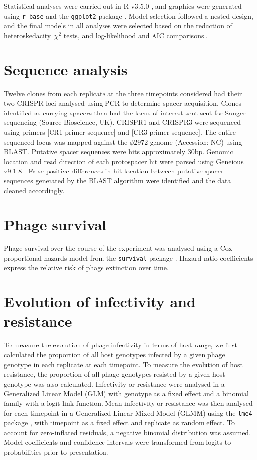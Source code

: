 \documentclass [12pt, a4paper, twoside]  {article}
\begin{document}
Statistical analyses were carried out in R v3.5.0 \citep{R}, and graphics were generated using \texttt{r-base} and the \texttt{ggplot2} package \citep{ggplot2}. Model selection followed a nested design, and the final models in all analyses were selected based on the reduction of heteroskedacity, $\chi ^2$ tests, and log-likelihood and AIC comparisons \citep{akaike1973,burnham2003model,burnham2004aic}.

\section*{Sequence analysis}
Twelve clones from each replicate at the three timepoints considered had their two CRISPR loci analysed using PCR to determine spacer acquisition. Clones identified as carrying spacers then had the locus of interest sent sent for Sanger sequencing (Source Bioscience, UK). CRISPR1 and CRISPR3 were sequenced using primers [CR1 primer sequence] and [CR3 primer sequence]. The entire sequenced locus was mapped against the $\phi 2972$ genome (Accession: NC) using BLAST. Putative spacer sequences were hits approximately 30bp. Genomic location and read direction of each protospacer hit were parsed using Geneious v9.1.8 \citep{kearse2012geneious}. False positive differences in hit location between putative spacer sequences generated by the BLAST algorithm were identified and the data cleaned accordingly. 

\section*{Phage survival}
Phage survival over the course of the experiment was analysed using a Cox proportional hazards model from the \texttt{survival} package \citep{survival}. Hazard ratio coefficients express the relative risk of phage extinction over time. 

\section*{Evolution of infectivity and resistance}
To measure the evolution of phage infectivity in terms of host range, we first calculated the proportion of all host genotypes infected by a given phage genotype in each replicate at each timepoint. To measure the evolution of host resistance, the proportion of all phage genotypes resisted by a given host genotype was also calculated. Infectivity or resistance were analysed in a Generalized Linear Model (GLM) with genotype as a fixed effect and a binomial family with a logit link function. Mean infectivity or resistance was then analysed for each timepoint in a Generalized Linear Mixed Model (GLMM) using the \texttt{lme4} package \citep{lme4}, with timepoint as a fixed effect and replicate as random effect. To account for zero-inflated residuals, a negative binomial distribution was assumed. Model coefficients and confidence intervals were transformed from logits to probabilities prior to presentation. 
\end{document}
